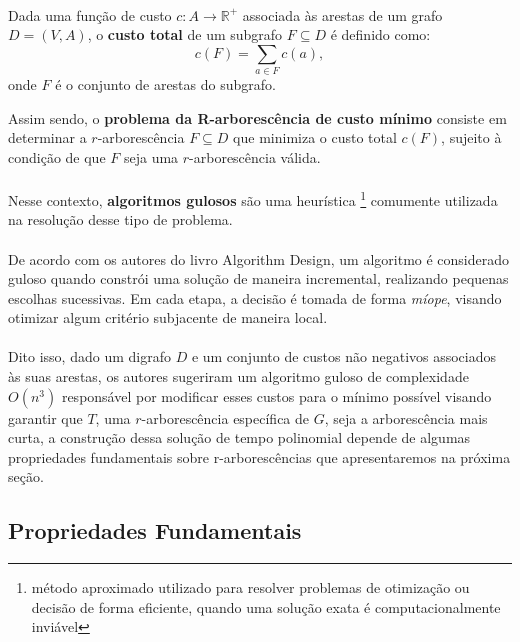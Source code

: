 \documentclass[12pt,a4paper]{article}
\begin{document}
\paragraph{}
Dada uma função de custo \(c: A \to \mathbb{R}^+\) associada às arestas de um grafo \(D = (V, A)\), o \textbf{custo total} de um subgrafo \(F \subseteq D\) é definido como:
\[
c(F) = \sum_{a \in F} c(a),
\]
onde \(F\) é o conjunto de arestas do subgrafo.

Assim sendo, o \textbf{problema da R-arborescência de custo mínimo} consiste em determinar a \(r\)-arborescência \(F \subseteq D\) que minimiza o custo total \(c(F)\), sujeito à condição de que \(F\) seja uma \(r\)-arborescência válida.

\paragraph{}
Nesse contexto, \textbf{algoritmos gulosos} são uma heurística \footnote{método aproximado utilizado para resolver problemas de otimização ou decisão de forma eficiente, quando uma solução exata é computacionalmente inviável} comumente utilizada na resolução desse tipo de problema.

\paragraph{}
De acordo com os autores do livro Algorithm Design, um algoritmo é considerado guloso quando constrói uma solução de maneira incremental, realizando pequenas escolhas sucessivas. Em cada etapa, a decisão é tomada de forma \textit{míope}, visando otimizar algum critério subjacente de maneira local.

\paragraph{}
Dito isso, dado um digrafo \( D \) e um conjunto de custos não negativos associados às suas arestas, os autores sugeriram um algoritmo guloso de complexidade \( O(n^3)\) responsável por modificar esses custos para o mínimo possível visando garantir que \( T \), uma \( r \)-arborescência específica de \( G \), seja a arborescência mais curta, a construção dessa solução de tempo polinomial depende de algumas propriedades fundamentais sobre r-arborescências que apresentaremos na próxima seção.

\subsection{Propriedades Fundamentais}
\end{document}
